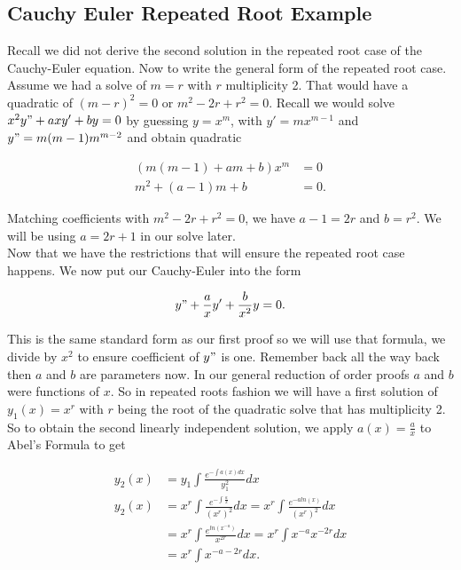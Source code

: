 \documentclass[12pt]{article}
\begin{document}
\subsection{Cauchy Euler Repeated Root Example}

Recall we did not derive the second solution in the repeated root case of the Cauchy-Euler equation. Now to write the general form of the repeated root case. Assume we had a solve of $m=r$ with $r$ multiplicity 2. That would have a quadratic of $(m-r)^2=0$ or $m^2-2r+r^2=0$. Recall we would solve $x^2y"+axy'+by=0$ by guessing $y=x^m$, with $y'=mx^{m-1}$ and $y"=m(m-1)m^{m-2}$ and obtain quadratic

\begin{align*}
    (m(m-1)+am+b)x^m &= 0 \\
    m^2+(a-1)m+b &= 0.
\end{align*}

Matching coefficients with $m^2-2r+r^2=0$, we have $a-1=2r$ and $b=r^2$. We will be using $a=2r+1$ in our solve later. \\

Now that we have the restrictions that will ensure the repeated root case happens. We now put our Cauchy-Euler into the form

\begin{equation*}
    y"+\frac{a}{x}y'+\frac{b}{x^2}y=0.
\end{equation*}

This is the same standard form as our first proof so we will use that formula, we divide by $x^2$ to ensure coefficient of $y"$ is one. Remember back all the way back then $a$ and $b$ are parameters now. In our general reduction of order proofs $a$ and $b$ were functions of $x$. So in repeated roots fashion we will have a first solution of $y_1(x)=x^{r}$ with $r$ being the root of the quadratic solve that has multiplicity 2. So to obtain the second linearly independent solution, we apply $a(x)=\frac{a}{x}$ to Abel's Formula to get

\begin{align*}
    y_2(x) &= y_1 \int \frac{e^{-\int a(x) dx}}{y_1^2} dx \\
    y_2(x) &= x^r \int \frac{e^{-\int \frac{a}{x}}}{(x^r)^2} dx = x^r \int \frac{e^{-aln(x)}}{(x^r)^2} dx \\
    &= x^r \int \frac{e^{ln(x^{-a})}}{x^{2r}} dx = x^r \int x^{-a}x^{-2r} dx \\
    &= x^r \int x^{-a-2r} dx.
\end{align*}
\end{document}
